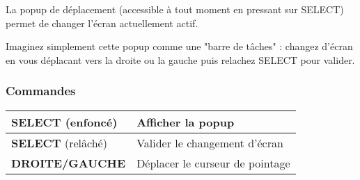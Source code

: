 La popup de déplacement (accessible à tout moment en pressant sur SELECT) permet de changer l'écran actuellement actif.


Imaginez simplement cette popup comme une "barre de tâches" : changez d'écran en vous déplacant vers la droite ou la gauche puis relachez SELECT pour valider.

\subsubsection{Commandes}

\tablelasttail{\hline}
\begin{supertabular}{|l|l|}
\hline
    {\bf SELECT} (enfoncé) & Afficher la popup \\
    \hline
    {\bf SELECT} (relâché) & Valider le changement d'écran \\
    \hline
    {\bf DROITE/GAUCHE} & Déplacer le curseur de pointage \\
\hline
\end{supertabular}
